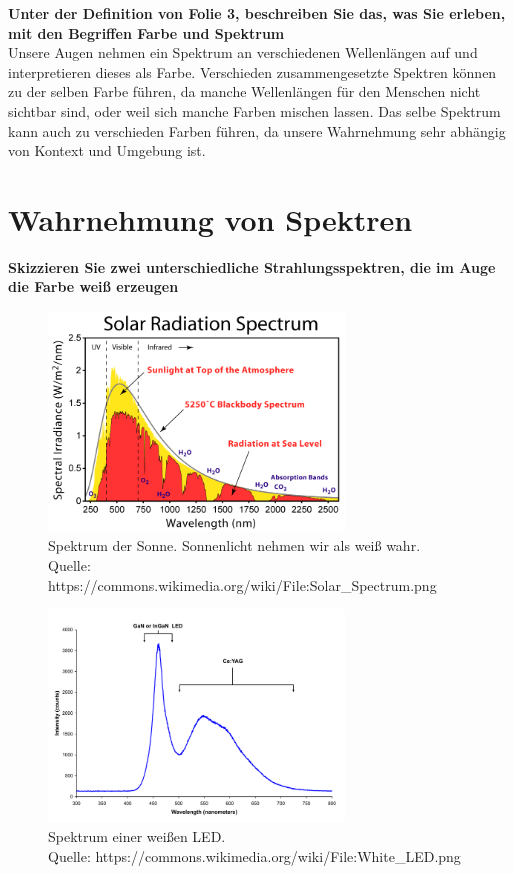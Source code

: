 \documentclass[a4paper]{article}
\begin{document}
	\textbf{Unter der Definition von Folie 3, beschreiben Sie das, was Sie erleben, mit den Begriffen Farbe und Spektrum}\\
	Unsere Augen nehmen ein Spektrum an verschiedenen Wellenlängen auf und interpretieren dieses als Farbe. Verschieden zusammengesetzte Spektren können zu der selben Farbe führen, da manche Wellenlängen für den Menschen nicht sichtbar sind, oder weil sich manche Farben mischen lassen. Das selbe Spektrum kann auch zu verschieden Farben führen, da unsere Wahrnehmung sehr abhängig von Kontext und Umgebung ist.
	
	\newpage
	
	\section{Wahrnehmung von Spektren}
	\textbf{Skizzieren Sie zwei unterschiedliche Strahlungsspektren, die im Auge die Farbe weiß erzeugen}\\
	
	\begin{figure}[h]
	\centering
	\includegraphics[width=0.7\textwidth]{Solar_Spectrum}
	\caption{Spektrum der Sonne. Sonnenlicht nehmen wir als weiß wahr.\\Quelle: https://commons.wikimedia.org/wiki/File:Solar\_Spectrum.png}
	\end{figure}

	\begin{figure}[h]
	\centering
	\includegraphics[width=0.7\textwidth]{White_LED}
	\caption{Spektrum einer weißen LED.\\Quelle: https://commons.wikimedia.org/wiki/File:White\_LED.png}
	\end{figure}
\end{document}
